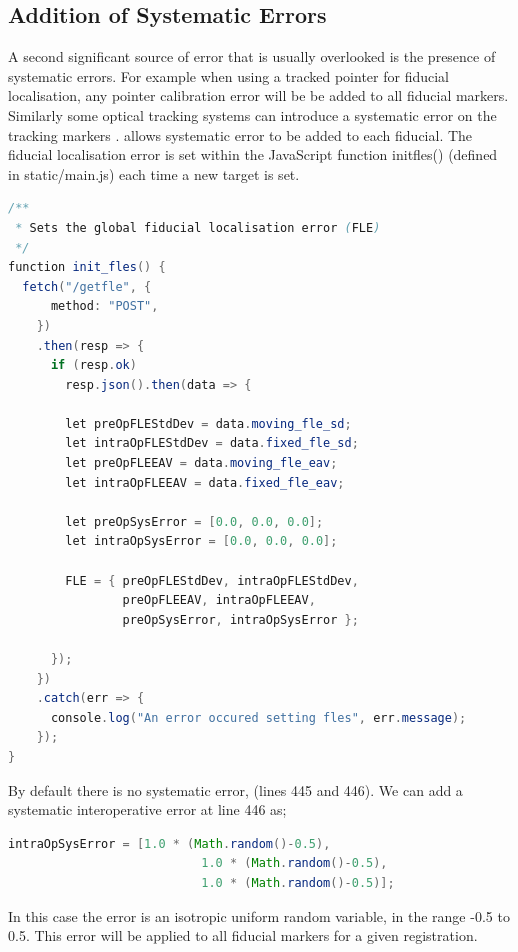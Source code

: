\subsection{Addition of Systematic Errors}
\label{sec:sys_method}
A second significant source of error that is usually overlooked is the presence of systematic errors. For example when using a tracked pointer for fiducial localisation, 
any pointer calibration error will be be added to all fiducial markers.
Similarly some optical tracking systems can introduce a systematic error on 
the tracking markers \cite{6294449}. \fred allows systematic error to 
be added to each fiducial. The fiducial localisation error is set within 
the JavaScript function init{\textunderscore}fles()
(defined in static/main.js) each time a new target is set. 
\begin{lstlisting}[language=java, firstnumber = 429]
/**
 * Sets the global fiducial localisation error (FLE)
 */
function init_fles() {
  fetch("/getfle", {
      method: "POST",
    })
    .then(resp => {
      if (resp.ok)
        resp.json().then(data => {

        let preOpFLEStdDev = data.moving_fle_sd;
        let intraOpFLEStdDev = data.fixed_fle_sd;
        let preOpFLEEAV = data.moving_fle_eav;
        let intraOpFLEEAV = data.fixed_fle_eav;

        let preOpSysError = [0.0, 0.0, 0.0];
        let intraOpSysError = [0.0, 0.0, 0.0];

        FLE = { preOpFLEStdDev, intraOpFLEStdDev,
                preOpFLEEAV, intraOpFLEEAV,
                preOpSysError, intraOpSysError };

      });
    })
    .catch(err => {
      console.log("An error occured setting fles", err.message);
    });
}
\end{lstlisting}
By default there is no systematic error, (lines 445 and 446). We can 
add a systematic interoperative error at line 446 as; 

\begin{lstlisting}[language=java, firstnumber = 446]
        intraOpSysError = [1.0 * (Math.random()-0.5), 
                           1.0 * (Math.random()-0.5), 
                           1.0 * (Math.random()-0.5)];
\end{lstlisting}

In this case the error is an isotropic uniform random variable, in the range
-0.5 to 0.5. This error will be applied to all fiducial markers for a 
given registration. 


